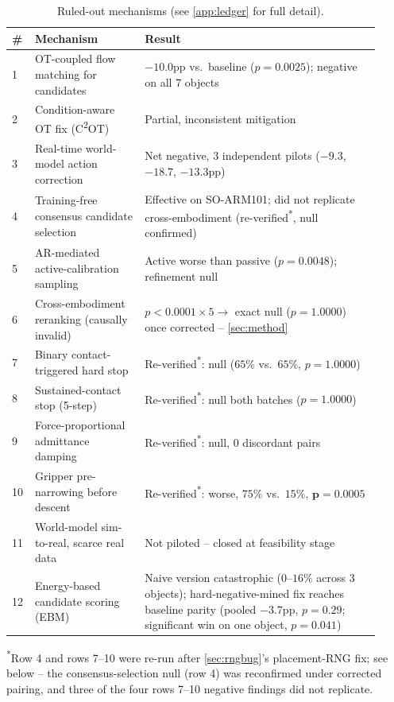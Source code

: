 \documentclass[journal]{IEEEtran}
\begin{document}
\begin{table}[t]
\centering
\caption{Ruled-out mechanisms (see \cref{app:ledger} for full detail).}
\label{tab:ledger}
\small
\begin{tabular}{@{}p{0.03\linewidth}p{0.29\linewidth}p{0.6\linewidth}@{}}
\toprule
\# & Mechanism & Result \\
\midrule
1 & OT-coupled flow matching for candidates & $-10.0$pp vs.\ baseline ($p{=}0.0025$); negative on all 7 objects \\
2 & Condition-aware OT fix (C\textsuperscript{2}OT) & Partial, inconsistent mitigation \\
3 & Real-time world-model action correction & Net negative, 3 independent pilots ($-9.3$, $-18.7$, $-13.3$pp) \\
4 & Training-free consensus candidate selection & Effective on SO-ARM101; did not replicate cross-embodiment (re-verified\textsuperscript{*}, null confirmed) \\
5 & AR-mediated active-calibration sampling & Active worse than passive ($p{=}0.0048$); refinement null \\
6 & Cross-embodiment reranking (causally invalid) & $p{<}0.0001{\times}5 \rightarrow$ exact null ($p{=}1.0000$) once corrected -- \cref{sec:method} \\
7 & Binary contact-triggered hard stop & Re-verified\textsuperscript{*}: null ($65\%$ vs.\ $65\%$, $p{=}1.0000$) \\
8 & Sustained-contact stop (5-step) & Re-verified\textsuperscript{*}: null both batches ($p{=}1.0000$) \\
9 & Force-proportional admittance damping & Re-verified\textsuperscript{*}: null, 0 discordant pairs \\
10 & Gripper pre-narrowing before descent & Re-verified\textsuperscript{*}: worse, $75\%$ vs.\ $15\%$, $\mathbf{p{=}0.0005}$ \\
11 & World-model sim-to-real, scarce real data & Not piloted -- closed at feasibility stage \\
12 & Energy-based candidate scoring (EBM) & Naive version catastrophic ($0$--$16\%$ across 3 objects); hard-negative-mined fix reaches baseline parity (pooled $-3.7$pp, $p{=}0.29$; significant win on one object, $p{=}0.041$) \\
\bottomrule
\end{tabular}
\end{table}
\vspace{-0.5em}
{\footnotesize\textsuperscript{*}Row 4 and rows 7--10 were re-run after
\cref{sec:rngbug}'s placement-RNG fix; see below -- the consensus-selection
null (row 4) was reconfirmed under corrected pairing, and three of the four
rows 7--10 negative findings did not replicate.}
\end{document}
